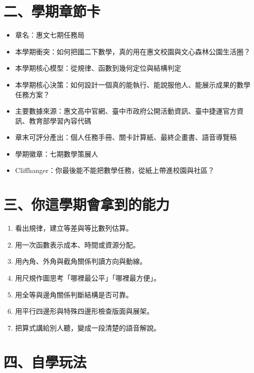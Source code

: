 \documentclass[
  chinese,
  12pt,
  a4paper,
  oneside]{article}
\providecommand{\tightlist}{%
  \setlength{\itemsep}{0pt}\setlength{\parskip}{0pt}}
\begin{document}
\section{二、學期章節卡}\label{ux4e8cux5b78ux671fux7ae0ux7bc0ux5361}

\begin{itemize}
\tightlist
\item
  章名：惠文七期任務局
\item
  本學期衝突：如何把國二下數學，真的用在惠文校園與文心森林公園生活圈？
\item
  本學期核心模型：從規律、函數到幾何定位與結構判定
\item
  本學期核心決策：如何設計一個真的能執行、能說服他人、能展示成果的數學任務方案？
\item
  主要數據來源：惠文高中官網、臺中市政府公開活動資訊、臺中捷運官方資訊、教育部學習內容代碼
\item
  章末可評分產出：個人任務手冊、關卡計算紙、最終企畫書、語音導覽稿
\item
  學期徽章：七期數學策展人
\item
  Cliffhanger：你最後能不能把數學任務，從紙上帶進校園與社區？
\end{itemize}

\section{三、你這學期會拿到的能力}\label{ux4e09ux4f60ux9019ux5b78ux671fux6703ux62ffux5230ux7684ux80fdux529b}

\begin{enumerate}
\def\labelenumi{\arabic{enumi}.}
\tightlist
\item
  看出規律，建立等差與等比數列估算。
\item
  用一次函數表示成本、時間或資源分配。
\item
  用內角、外角與截角關係判讀方向與動線。
\item
  用尺規作圖思考「哪裡最公平」「哪裡最方便」。
\item
  用全等與邊角關係判斷結構是否可靠。
\item
  用平行四邊形與特殊四邊形檢查版面與展架。
\item
  把算式講給別人聽，變成一段清楚的語音解說。
\end{enumerate}

\section{四、自學玩法}\label{ux56dbux81eaux5b78ux73a9ux6cd5}
\end{document}
